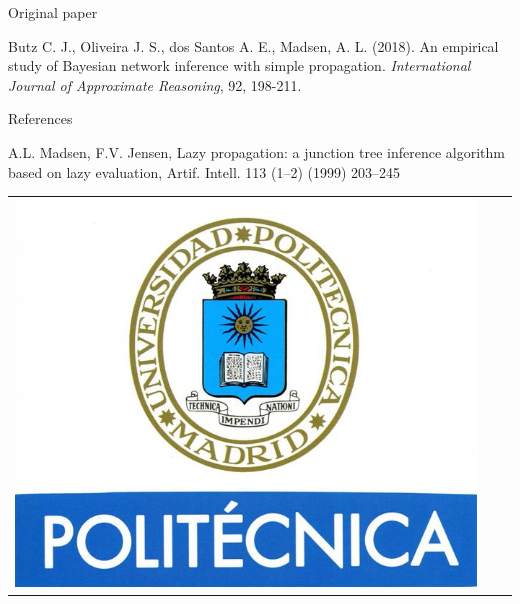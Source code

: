 \documentclass[final]{beamer}
\newlength{\onecolwid}
\begin{document}
\begin{frame}[t]
\begin{columns}[t]
\begin{column}{\onecolwid}
\begin{block}{Original paper}

Butz C. J., Oliveira J. S., dos Santos A. E., Madsen, A. L. (2018). An empirical study of Bayesian network inference with simple propagation. \textit{International Journal of Approximate Reasoning}, 92, 198-211.

\end{block}



\begin{block}{References}
\nocite{*} %
\small{
\vspace{0.75in}}
\begin{thebibliography}{}

A.L. Madsen, F.V. Jensen, Lazy propagation: a junction tree inference algorithm based on lazy evaluation, Artif. Intell. 113 (1–2) (1999) 203–245

\end{thebibliography}


\end{block}


\begin{center}
\begin{tabular}{ccc}
\includegraphics[width=0.4\linewidth]{logoUPM.jpg} 
\end{tabular}
\end{center}


\end{column} %

\end{columns} %

\end{frame} %
\end{document}
